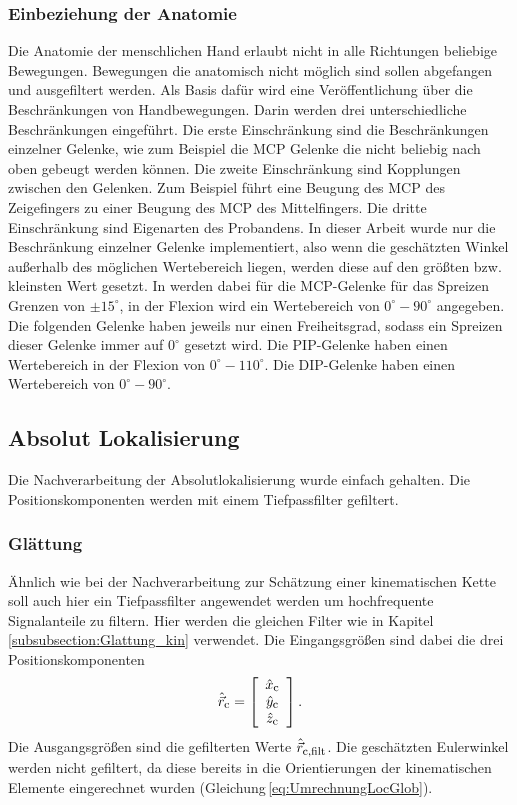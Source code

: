 \subsubsection{Einbeziehung der Anatomie}
Die Anatomie der menschlichen Hand erlaubt nicht in alle Richtungen beliebige Bewegungen. Bewegungen die anatomisch nicht möglich sind sollen abgefangen und ausgefiltert werden. Als Basis dafür wird eine Veröffentlichung \cite{lin_modeling_2000} über die Beschränkungen von Handbewegungen. Darin werden drei unterschiedliche Beschränkungen eingeführt. Die erste Einschränkung sind die Beschränkungen einzelner Gelenke, wie zum Beispiel die MCP Gelenke die nicht beliebig nach oben gebeugt werden können. Die zweite Einschränkung sind Kopplungen zwischen den Gelenken. Zum Beispiel führt eine Beugung des MCP des Zeigefingers zu einer Beugung des MCP des Mittelfingers. Die dritte Einschränkung sind Eigenarten des Probandens. In dieser Arbeit wurde nur die Beschränkung einzelner Gelenke implementiert, also wenn die geschätzten Winkel außerhalb des möglichen Wertebereich liegen, werden diese auf den größten bzw. kleinsten Wert gesetzt. In \cite{lin_modeling_2000} werden dabei für die MCP-Gelenke für das Spreizen Grenzen von $\pm 15^\circ$, in der Flexion wird ein Wertebereich von $0^\circ-90^\circ$ angegeben. Die folgenden Gelenke haben jeweils nur einen Freiheitsgrad, sodass ein Spreizen dieser Gelenke immer auf $0^\circ$ gesetzt wird. Die PIP-Gelenke haben einen Wertebereich in der Flexion von $0^\circ-110^\circ$. Die DIP-Gelenke haben einen Wertebereich von $0^\circ-90^\circ$. 


\subsection{Absolut Lokalisierung}
Die Nachverarbeitung der Absolutlokalisierung wurde einfach gehalten. Die Positionskomponenten werden mit einem Tiefpassfilter gefiltert.



\subsubsection{Glättung}
Ähnlich wie bei der Nachverarbeitung zur Schätzung einer kinematischen Kette soll auch hier ein Tiefpassfilter angewendet werden um hochfrequente Signalanteile zu filtern. Hier werden die gleichen Filter wie in Kapitel \ref{subsubsection:Glattung_kin} verwendet. Die Eingangsgrößen sind dabei die drei Positionskomponenten 
\begin{equation}
    \hat{\vec{r}}_{\textrm{\footnotesize{c}}} = \left[\begin{array}{c} \hat{x}_{\textrm{\footnotesize{c}}}\\ \hat{y}_{\textrm{\footnotesize{c}}} \\ \hat{z}_{\textrm{\footnotesize{c}}} \end{array}\right]. 
\end{equation}
Die Ausgangsgrößen sind die gefilterten Werte $\hat{\vec{r}}_{\textrm{\footnotesize{c,filt}}}$. Die geschätzten Eulerwinkel werden nicht gefiltert, da diese bereits in die Orientierungen der kinematischen Elemente eingerechnet wurden (Gleichung\,\ref{eq:UmrechnungLocGlob}).

